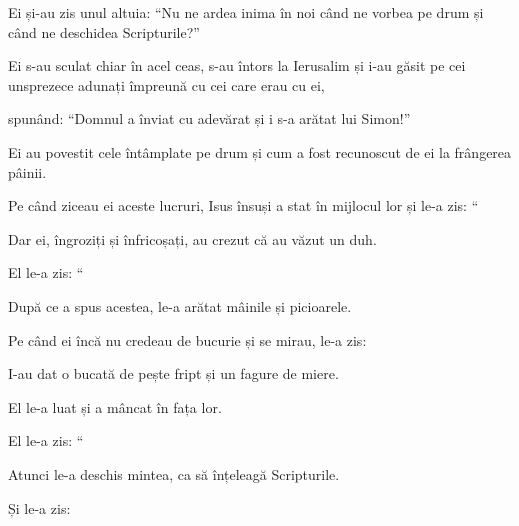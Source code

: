 {Ei și-au zis unul altuia: “Nu ne ardea inima în noi când ne vorbea pe drum și când ne deschidea Scripturile?”

Ei s-au sculat chiar în acel ceas, s-au întors la Ierusalim și i-au găsit pe cei unsprezece adunați împreună cu cei care erau cu ei,

spunând: “Domnul a înviat cu adevărat și i s-a arătat lui Simon!”

Ei au povestit cele întâmplate pe drum și cum a fost recunoscut de ei la frângerea pâinii.


\par }{\PP {}Pe când ziceau ei aceste lucruri, Isus însuși a stat în mijlocul lor și le-a zis: “{}


\par }{\PP {}Dar ei, îngroziți și înfricoșați, au crezut că au văzut un duh.


\par }{\PP {}El le-a zis: “{}


După ce a spus acestea, le-a arătat mâinile și picioarele.

Pe când ei încă nu credeau de bucurie și se mirau, le-a zis:
{}


\par }{\PP {}I-au dat o bucată de pește fript și un fagure de miere.

El le-a luat și a mâncat în fața lor.

El le-a zis: “{}


\par }{\PP {}Atunci le-a deschis mintea, ca să înțeleagă Scripturile.

Și le-a zis:
{}



}
